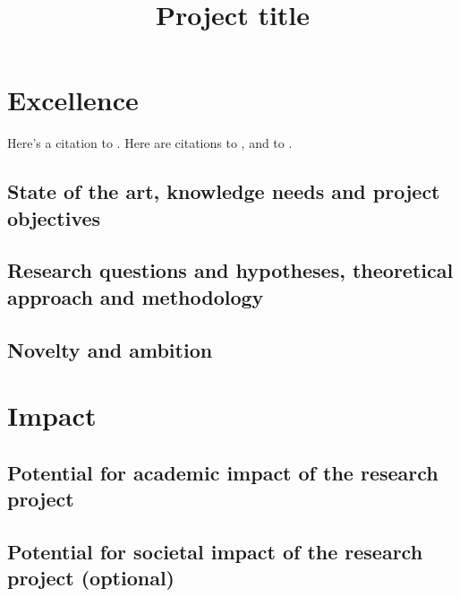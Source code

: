 \documentclass{nfr}
\title{Project title}
\begin{document}

% 
% 
% 
% 


\maketitle

\section{Excellence}

Here's a citation to \cite{texbook}. Here are citations to \cite{texbook,knuth:1984,lesk:1977}, and to \cite{lesk:1977,texbook,latex2e}.

\subsection{State of the art, knowledge needs and project objectives}

\subsection{Research questions and hypotheses, theoretical approach and methodology}

\subsection{Novelty and ambition}

\section{Impact}

\subsection{Potential for academic impact of the research project}

\subsection{Potential for societal impact of the research project (optional)}
\end{document}
